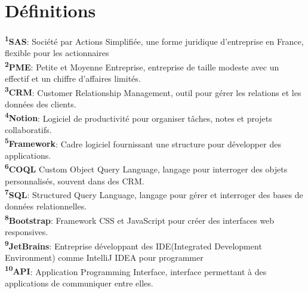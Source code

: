 \section*{Définitions}

\begin{small}
    \noindent \vspace{0.3cm}
    \textbf{\textsuperscript{1}SAS}: Société par Actions Simplifiée, une forme juridique d'entreprise en France, flexible pour les actionnaires \\\vspace{0.3cm}
    \textbf{\textsuperscript{2}PME}: Petite et Moyenne Entreprise, entreprise de taille modeste avec un effectif et un chiffre d'affaires limités. \\\vspace{0.3cm}
    \textbf{\textsuperscript{3}CRM}: Customer Relationship Management, outil pour gérer les relations et les données des clients.\\\vspace{0.3cm}
    \textbf{\textsuperscript{4}Notion}: Logiciel de productivité pour organiser tâches, notes et projets collaboratifs. \\\vspace{0.3cm}
    \textbf{\textsuperscript{5}Framework}: Cadre logiciel fournissant une structure pour développer des applications. \\\vspace{0.3cm}
     \textbf{\textsuperscript{6}COQL} Custom Object Query Language, langage pour interroger des objets personnalisés, souvent dans des CRM.\\\vspace{0.3cm}
     \textbf{\textsuperscript{7}SQL}: Structured Query Language, langage pour gérer et interroger des bases de données relationnelles. \\\vspace{0.3cm}
    \textbf{\textsuperscript{8}Bootstrap}: Framework CSS et JavaScript pour créer des interfaces web responsives. \\\vspace{0.3cm}
    \textbf{\textsuperscript{9}JetBrains}: Entreprise développant des IDE(Integrated Development Environment) comme IntelliJ IDEA pour programmer\\\vspace{0.3cm}
    \textbf{\textsuperscript{10}API}: Application Programming Interface, interface permettant à des applications de communiquer entre elles.\\\vspace{0.3cm}

\end{small}
